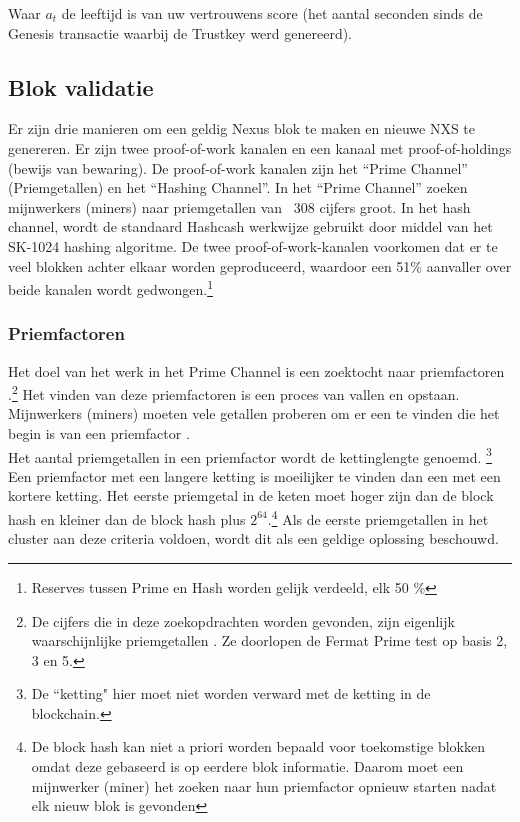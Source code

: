 \documentclass[11pt]{article}
\begin{document}
\noindent Waar $a_t$ de leeftijd is van uw vertrouwens score (het aantal seconden sinds de Genesis transactie waarbij de Trustkey werd genereerd).

\subsection{Blok validatie}

Er zijn drie manieren om een ​​geldig Nexus blok te maken en nieuwe NXS te genereren. Er zijn twee proof-of-work kanalen en een kanaal met proof-of-holdings (bewijs van bewaring). De proof-of-work kanalen zijn het “Prime Channel” (Priemgetallen) en het “Hashing Channel”. In het “Prime Channel” zoeken mijnwerkers (miners) naar priemgetallen van ~308 cijfers groot.
In het hash channel, wordt de standaard Hashcash \cite{hashcash} werkwijze gebruikt door middel van het SK-1024 hashing algoritme. 
De twee proof-of-work-kanalen voorkomen dat er te veel blokken achter elkaar worden geproduceerd, waardoor een 51\% aanvaller over beide kanalen wordt gedwongen.\footnote{Reserves tussen Prime en Hash worden gelijk verdeeld, elk 50 \%}

\subsubsection{Priemfactoren}

Het doel van het werk in het Prime Channel is een zoektocht naar priemfactoren \cite{wikiprimecluster}.\footnote{De cijfers die in deze zoekopdrachten worden gevonden, zijn eigenlijk waarschijnlijke priemgetallen \cite{wikiprobable}. Ze doorlopen de Fermat Prime test \cite{wikifermat} op basis 2, 3 en 5.}
Het vinden van deze priemfactoren is een proces van vallen en opstaan. Mijnwerkers (miners) moeten vele getallen proberen om er een te vinden die het begin is van een priemfactor \cite{wolframprimecluster,primesolominer}.\\ 

\noindent Het aantal priemgetallen in een priemfactor wordt de kettinglengte genoemd.
\footnote{De ``ketting" hier moet niet worden verward met de ketting in de blockchain.}
Een priemfactor met een langere ketting is moeilijker te vinden dan een met een kortere ketting. Het eerste priemgetal in de keten moet hoger zijn dan de block hash en kleiner dan de block hash plus $2^{64}$.\footnote{De block hash kan niet a priori worden bepaald voor toekomstige blokken omdat deze gebaseerd is op eerdere blok informatie. Daarom moet een mijnwerker (miner) het zoeken naar hun priemfactor opnieuw starten nadat elk nieuw blok is gevonden}
Als de eerste priemgetallen in het cluster aan deze criteria voldoen, wordt dit als een geldige oplossing beschouwd.\\
\end{document}

